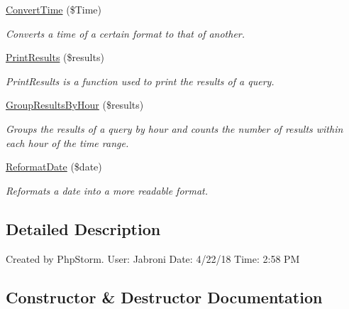 \begin{DoxyCompactItemize}
\hyperlink{interface_p_h_pto_s_q_l_interface_adbaa8f880037cb88ee1f527f6c0971b2}{Convert\+Time} (\$Time)
\begin{DoxyCompactList}\small\item\em Converts a time of a certain format to that of another. \end{DoxyCompactList}\item 
\hyperlink{interface_p_h_pto_s_q_l_interface_a01acbca2f4fed77736c1c498fb57583c}{Print\+Results} (\$results)
\begin{DoxyCompactList}\small\item\em Print\+Results is a function used to print the results of a query. \end{DoxyCompactList}\item 
\hyperlink{interface_p_h_pto_s_q_l_interface_a8fcdf2951d5159f94775133b11c29328}{Group\+Results\+By\+Hour} (\$results)
\begin{DoxyCompactList}\small\item\em Groups the results of a query by hour and counts the number of results within each hour of the time range. \end{DoxyCompactList}\item 
\hyperlink{interface_p_h_pto_s_q_l_interface_a939709f50283d3d5e8297fb0f608acf4}{Reformat\+Date} (\$date)
\begin{DoxyCompactList}\small\item\em Reformats a date into a more readable format. \end{DoxyCompactList}\end{DoxyCompactItemize}


\subsection{Detailed Description}
Created by Php\+Storm. User\+: Jabroni Date\+: 4/22/18 Time\+: 2\+:58 PM 

\subsection{Constructor \& Destructor Documentation}
